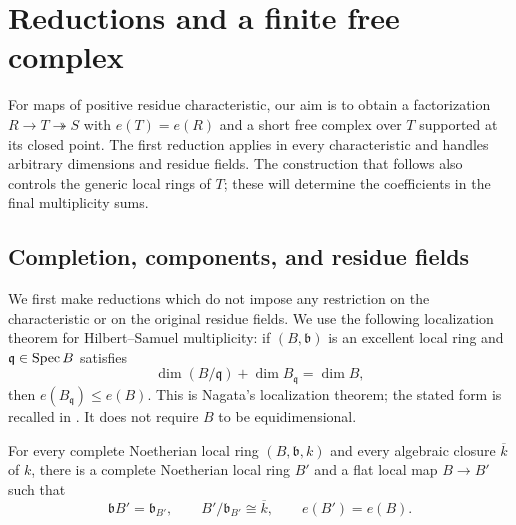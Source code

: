 \section{Reductions and a finite free complex}\label{sec:reductions}

For maps of positive residue characteristic, our aim is to obtain
a factorization
$R\to T\twoheadrightarrow S$ with $e(T)=e(R)$ and a short free
complex over $T$ supported at its closed point. The first reduction
applies in every characteristic and handles arbitrary dimensions
and residue fields. The construction
that follows also controls the generic local rings of $T$; these
will determine the coefficients in the final multiplicity sums.

\subsection{Completion, components, and residue fields}

We first make reductions which do not impose any restriction on the
characteristic or on the original residue fields.  We use the following
localization theorem for Hilbert--Samuel multiplicity: if $(B,\mathfrak b)$
is an excellent local ring and $\mathfrak q\in\operatorname{Spec} B$ satisfies
\[
  \dim(B/\mathfrak q)+\dim B_{\mathfrak q}=\dim B,
\]
then $e(B_{\mathfrak q})\leq e(B)$.  This is Nagata's localization theorem;
the stated form is recalled in \cite[Theorem~2.1]{Ma}.  It does not require
$B$ to be equidimensional.

\begin{lemma}\label{lem:residue-extension}
For every complete Noetherian local ring $(B,\mathfrak b,k)$ and every
algebraic closure $\overline{k}$ of $k$, there is a complete Noetherian
local ring $B'$ and a flat local map $B\to B'$ such that
\[
  \mathfrak bB'=\mathfrak b_{B'},\qquad
  B'/\mathfrak b_{B'}\cong\overline{k},\qquad e(B')=e(B).
\]
\end{lemma}


